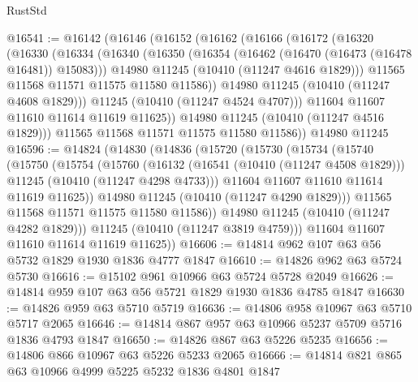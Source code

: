 \begin{lexlean}{RustStd}
\begin{coremodule}
@16541 := @16142
    (@16146
      (@16152
        (@16162
          (@16166
            (@16172
              (@16320
                (@16330
                  (@16334
                    (@16340
                      (@16350
                        (@16354 (@16462 (@16470 (@16473 (@16478 @16481)) @15083)))
                        @14980
                        @11245
                        (@10410 (@11247 @4616 @1829)))
                      @11565
                      @11568
                      @11571
                      @11575
                      @11580
                      @11586))
                  @14980
                  @11245
                  (@10410 (@11247 @4608 @1829)))
                @11245
                (@10410 (@11247 @4524 @4707)))
              @11604
              @11607
              @11610
              @11614
              @11619
              @11625))
          @14980
          @11245
          (@10410 (@11247 @4516 @1829)))
        @11565
        @11568
        @11571
        @11575
        @11580
        @11586))
    @14980
    @11245
@16596 := @14824
    (@14830
      (@14836
        (@15720
          (@15730
            (@15734
              (@15740
                (@15750
                  (@15754
                    (@15760
                      (@16132
                        (@16541 (@10410 (@11247 @4508 @1829)))
                        @11245
                        (@10410 (@11247 @4298 @4733)))
                      @11604
                      @11607
                      @11610
                      @11614
                      @11619
                      @11625))
                  @14980
                  @11245
                  (@10410 (@11247 @4290 @1829)))
                @11565
                @11568
                @11571
                @11575
                @11580
                @11586))
            @14980
            @11245
            (@10410 (@11247 @4282 @1829)))
          @11245
          (@10410 (@11247 @3819 @4759)))
        @11604
        @11607
        @11610
        @11614
        @11619
        @11625))
@16606 := @14814 @962 @107 @63 @56 @5732 @1829 @1930 @1836 @4777 @1847
@16610 := @14826 @962 @63 @5724 @5730
@16616 := @15102 @961 @10966 @63 @5724 @5728 @2049
@16626 := @14814 @959 @107 @63 @56 @5721 @1829 @1930 @1836 @4785 @1847
@16630 := @14826 @959 @63 @5710 @5719
@16636 := @14806 @958 @10967 @63 @5710 @5717 @2065
@16646 := @14814 @867 @957 @63 @10966 @5237 @5709 @5716 @1836 @4793 @1847
@16650 := @14826 @867 @63 @5226 @5235
@16656 := @14806 @866 @10967 @63 @5226 @5233 @2065
@16666 := @14814 @821 @865 @63 @10966 @4999 @5225 @5232 @1836 @4801 @1847

\end{coremodule}
\end{lexlean}
